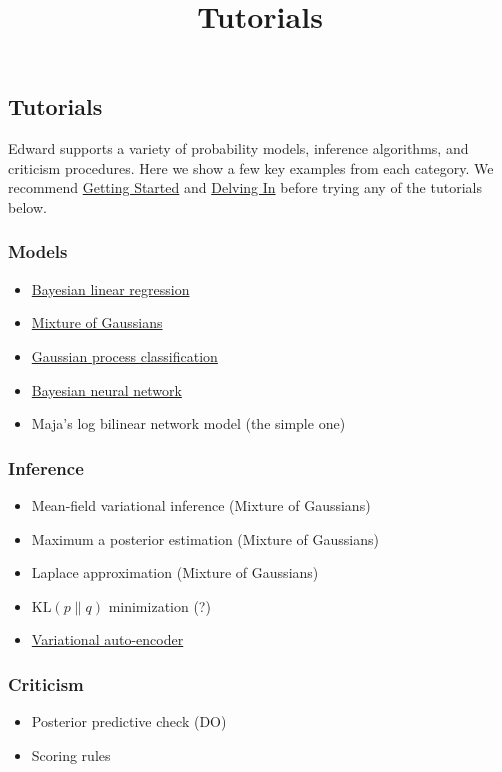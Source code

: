 \title{Tutorials}

\subsection{Tutorials}

Edward supports a variety of probability models, inference
algorithms, and criticism procedures. Here we show a few key examples from each
category. We recommend \href{getting-started.html}{Getting Started} and 
\href{delving-in.html}{Delving In} before trying any of the tutorials below.

\subsubsection{Models}

\begin{itemize}
\item \href{tut_bayesian_linear_regression.html}{Bayesian linear regression}
\item \href{tut_mixture_gaussian.html}{Mixture of Gaussians}
\item \href{tut_gp_classification.html}{Gaussian process classification}
\item \href{tut_bayesian_nn.html}{Bayesian neural network}
\item Maja's log bilinear network model (the simple one)
\end{itemize}

\subsubsection{Inference}

\begin{itemize}
  \item Mean-field variational inference (Mixture of Gaussians)
  \item Maximum a posterior estimation (Mixture of Gaussians)
  \item Laplace approximation (Mixture of Gaussians)
  \item $\text{KL}(p\|q)$ minimization (?)
  \item
  \href{https://github.com/blei-lab/edward/blob/master/examples/convolutional_vae.py}{Variational
  auto-encoder}
\end{itemize}

\subsubsection{Criticism}

\begin{itemize}
  \item Posterior predictive check (DO)
  \item Scoring rules
\end{itemize}
